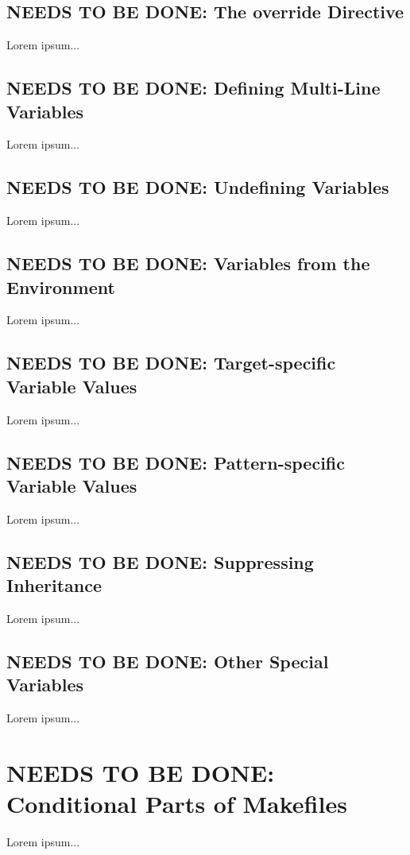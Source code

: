 \documentclass{charun}
\begin{document}
\begin{multicols*}{2}
\color{gray}
\subsection{NEEDS TO BE DONE: The override Directive}
Lorem ipsum...
\color{black}

\color{gray}
\subsection{NEEDS TO BE DONE: Defining Multi-Line Variables}
Lorem ipsum...
\color{black}

\color{gray}
\subsection{NEEDS TO BE DONE: Undefining Variables}
Lorem ipsum...
\color{black}

\color{gray}
\subsection{NEEDS TO BE DONE: Variables from the Environment}
Lorem ipsum...
\color{black}

\color{gray}
\subsection{NEEDS TO BE DONE: Target-specific Variable Values}
Lorem ipsum...
\color{black}

\color{gray}
\subsection{NEEDS TO BE DONE: Pattern-specific Variable Values}
Lorem ipsum...
\color{black}

\color{gray}
\subsection{NEEDS TO BE DONE: Suppressing Inheritance}
Lorem ipsum...
\color{black}

\color{gray}
\subsection{NEEDS TO BE DONE: Other Special Variables}
Lorem ipsum...
\color{black}


\color{gray}
\section{NEEDS TO BE DONE: Conditional Parts of Makefiles}
Lorem ipsum...
\color{black}



\end{multicols*}
\end{document}
